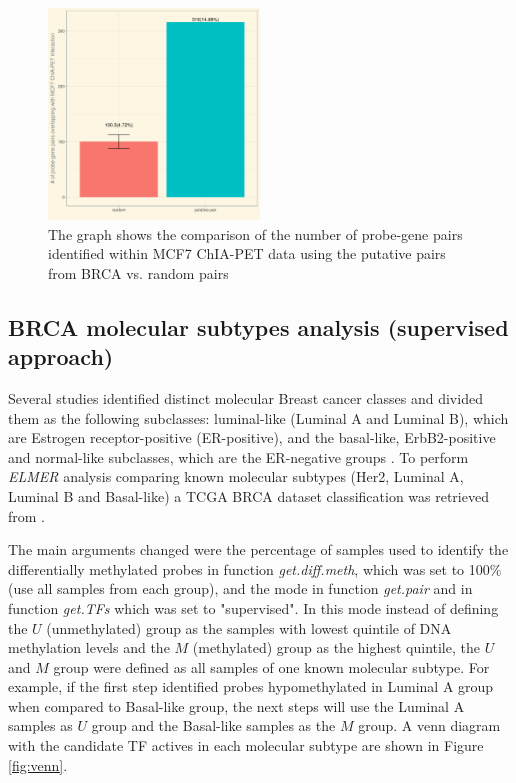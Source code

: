 \begin{figure}
\centering
\includegraphics[width=0.5\textwidth]{images/validation.png}
\caption[MCF7 ChIA-PET validation]{\label{fig:chiapet} The graph shows the comparison of the number of probe-gene pairs identified within MCF7 ChIA-PET data using the putative pairs from BRCA vs. random pairs}
\end{figure}

\subsection{BRCA molecular subtypes analysis (supervised approach)}

Several studies identified distinct molecular Breast cancer classes and
divided them as the following subclasses: luminal-like (Luminal A and Luminal B),
which are Estrogen receptor-positive (ER-positive), and the basal-like,
ErbB2-positive and normal-like subclasses, which are the ER-negative
groups \cite{perou2000molecular,yersal2014biological,sorlie2001gene}.
To perform \textit{ELMER} analysis comparing known molecular subtypes
(Her2, Luminal A, Luminal B and Basal-like) a TCGA BRCA dataset classification
was retrieved from .


The main arguments changed were the percentage of samples used to identify the
differentially methylated probes in function \textit{get.diff.meth}, which was
set to 100\% (use all samples from each group), and the mode in function \textit{get.pair}
and in function \textit{get.TFs} which was set to "supervised". In this mode instead
of defining the $U$ (unmethylated) group as the samples with lowest quintile of DNA
methylation levels and the $M$ (methylated) group as the highest quintile, the $U$ and $M$ group
 were defined as all samples of one known molecular subtype.
 For example, if the first step identified probes hypomethylated in Luminal A group when compared to Basal-like group,
 the next steps will use the Luminal A samples as $U$ group  and the Basal-like samples as the $M$ group.
A venn diagram with the candidate TF actives in each molecular subtype are shown in Figure \ref{fig:venn}.

